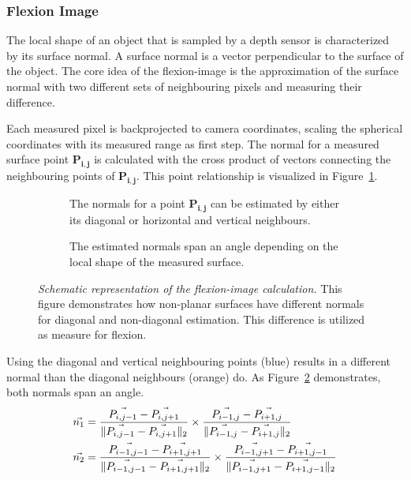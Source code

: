 \subsubsection{Flexion Image}\label{flexion-image-section}

The local shape of an object that is sampled by a depth sensor is characterized by its surface normal.
A surface normal is a vector perpendicular to the surface of the object.
The core idea of the \Gls{flexion-image} is the approximation of the surface normal with two different sets of neighbouring pixels and measuring their difference.

Each measured pixel is backprojected to camera coordinates, scaling the spherical coordinates with its measured range as first step.
The normal for a measured surface point $\mathbf{P_{i,j}}$ is calculated with the cross product of vectors connecting the neighbouring points of $\mathbf{P_{i,j}}$.
This point relationship is visualized in Figure~\ref{fig:flexion_normals_plane}.
\begin{figure}[ht]
    \begin{subfigure}[t]{0.48\linewidth}
        \centering
        \scalebox{1.0}{%
        
        }
        \caption{The normals for a point $\mathbf{P_{i,j}}$ can be estimated by either its diagonal or horizontal and vertical neighbours.}\label{fig:flexion_normals_plane}
    \end{subfigure}\quad
    \begin{subfigure}[t]{0.49\linewidth}
        \centering
        \scalebox{1.0}{%
        
        }
        \caption{The estimated normals span an angle depending on the local shape of the measured surface.}\label{fig:flexion_space}
    \end{subfigure}
    \caption[Schematic representation of the \gls{flexion-image} calculation]{\emph{Schematic representation of the \gls{flexion-image} calculation.} This figure demonstrates how non-planar surfaces have different normals for diagonal and non-diagonal estimation. This difference is utilized as measure for flexion.}%
    \label{fig:flexion-image-scetched}
\end{figure}
Using the diagonal and vertical neighbouring points (blue) results in a different normal than the diagonal neighbours (orange) do.
As Figure~\ref{fig:flexion_space} demonstrates, both normals span an angle.
\begin{equation}
\begin{aligned}
    \vec{n_1} &= \frac{\vec{P_{i,j-1}} - \vec{P_{i,j+1}}}{\lVert\vec{P_{i,j-1}} - \vec{P_{i,j+1}}\rVert_{2}}
                \times \frac{\vec{P_{i-1,j}} - \vec{P_{i+1,j}}}{\lVert\vec{P_{i-1,j}} - \vec{P_{i+1,j}}\rVert_{2}} \\
    \vec{n_2} &= \frac{\vec{P_{i-1,j-1}} - \vec{P_{i+1,j+1}}}{\lVert\vec{P_{i-1,j-1}} - \vec{P_{i+1,j+1}}\rVert_{2}}
                \times \frac{\vec{P_{i-1,j+1}} - \vec{P_{i+1,j-1}}}{\lVert\vec{P_{i-1,j+1}} - \vec{P_{i+1,j-1}}\rVert_{2}}
    \label{eq:flexion_normals}
\end{aligned}
\end{equation}
